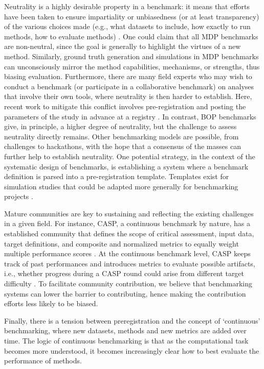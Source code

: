 \documentclass[11pt]{article}
\begin{document}
Neutrality is a highly desirable property in a benchmark: it means that efforts have been taken to ensure impartiality or unbiasedness (or at least transparency) of the various choices made (e.g., what datasets to include, how exactly to run methods, how to evaluate methods) \cite{Weber2019-el, Jelizarow2010-kr}. One could claim that all MDP benchmarks are non-neutral, since the goal is generally to highlight the virtues of a new method. Similarly, ground truth generation and simulations in MDP benchmarks can unconsciously mirror the method capabilities, mechanisms, or strengths, thus biasing evaluation. Furthermore, there are many field experts who may wish to conduct a benchmark (or participate in a collaborative benchmark) on analyses that involve their own tools, where neutrality is then harder to establish. Here, recent work to mitigate this conflict involves pre-registration and posting the parameters of the study in advance at a registry \cite{Sullivan2019-wh, Olevska2021-if, Teo2024-wk}. In contrast, BOP benchmarks give, in principle, a higher degree of neutrality, but the challenge to assess neutrality directly remains. Other benchmarking models are possible, from challenges to hackathons, with the hope that a consensus of the masses can further help to establish neutrality. One potential strategy, in the context of the systematic design of benchmarks, is establishing a system where a benchmark definition is parsed into a pre-registration template. Templates exist for simulation studies that could be adapted more generally for benchmarking projects \cite{Siepe2023-tz}. 

{\color{red}
Mature communities are key to sustaining and reflecting the existing challenges in a given field. For instance, CASP, a continuous benchmark by nature, has a established community that defines the scope of critical assessment, input data, target definitions, and composite and normalized metrics to equally weight multiple performance scores \cite{simpkin2023tertiary}. At the continuous benchmark level, CASP keeps track of past performances and introduces metrics to evaluate possible artifacts, i.e., whether progress during a CASP round could arise from different target difficulty \cite{kryshtafovych2019critical}. To facilitate community contribution, we believe that benchmarking systems can lower the barrier to contributing, hence making the contribution efforts less likely to be biased. 
}

Finally, there is a tension between preregistration and the concept of `continuous' benchmarking, where new datasets, methods and new metrics are added over time. The logic of continuous benchmarking is that as the computational task becomes more understood, it becomes increasingly clear how to best evaluate the performance of methods. 
\end{document}
